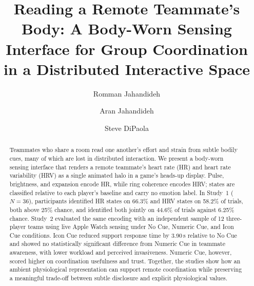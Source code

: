 \documentclass[sigconf]{acmart}
\begin{document}
\title[Reading a Remote Teammate's Body]%
{Reading a Remote Teammate's Body: A Body-Worn Sensing Interface for Group Coordination in a Distributed Interactive Space}

\author{Romman Jahandideh}

\author{Aran Jahandideh}

\author{Steve DiPaola}

\renewcommand{\shortauthors}{Jahandideh et al.}

\begin{abstract}
Teammates who share a room read one another's effort and strain from subtle bodily cues, many of which are lost in distributed interaction. We present a body-worn sensing interface that renders a remote teammate's heart rate (HR) and heart rate variability (HRV) as a single animated halo in a game's heads-up display. Pulse, brightness, and expansion encode HR, while ring coherence encodes HRV; states are classified relative to each player's baseline and carry no emotion label. In Study~1 ($N=36$), participants identified HR states on 66.3\% and HRV states on 58.2\% of trials, both above 25\% chance, and identified both jointly on 44.6\% of trials against 6.25\% chance. Study~2 evaluated the same encoding with an independent sample of 12 three-player teams using live Apple Watch sensing under No Cue, Numeric Cue, and Icon Cue conditions. Icon Cue reduced support response time by 3.90\,s relative to No Cue and showed no statistically significant difference from Numeric Cue in teammate awareness, with lower workload and perceived invasiveness. Numeric Cue, however, scored higher on coordination usefulness and trust. Together, the studies show how an ambient physiological representation can support remote coordination while preserving a meaningful trade-off between subtle disclosure and explicit physiological values.
\end{abstract}
\end{document}
